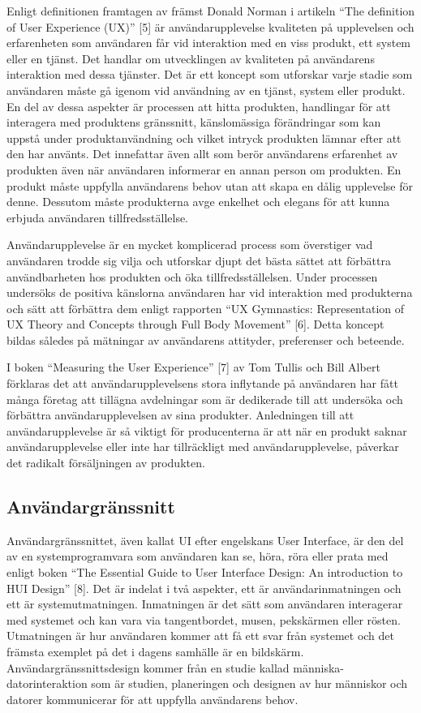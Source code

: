 \documentclass{kththesis}
\begin{document}
Enligt definitionen framtagen av främst Donald Norman i artikeln “The definition of User Experience (UX)” [5] är användarupplevelse kvaliteten på upplevelsen och erfarenheten som användaren får vid interaktion med en viss produkt, ett system eller en tjänst. Det handlar om utvecklingen av kvaliteten på användarens interaktion med dessa tjänster. Det är ett koncept som utforskar varje stadie som användaren måste gå igenom vid användning av en tjänst, system eller produkt. En del av dessa aspekter är processen att hitta produkten, handlingar för att interagera med produktens gränssnitt, känslomässiga förändringar som kan uppstå under produktanvändning och vilket intryck produkten lämnar efter att den har använts. Det innefattar även allt som berör användarens erfarenhet av produkten även när användaren informerar en annan person om produkten. En produkt måste uppfylla användarens behov utan att skapa en dålig upplevelse för denne. Dessutom måste produkterna avge enkelhet och elegans för att kunna erbjuda användaren tillfredsställelse. 

Användarupplevelse är en mycket komplicerad process som överstiger vad användaren trodde sig vilja och utforskar djupt det bästa sättet att förbättra användbarheten hos produkten och öka tillfredsställelsen. Under processen undersöks de positiva känslorna användaren har vid interaktion med produkterna och sätt att förbättra dem enligt rapporten “UX Gymnastics: Representation of UX Theory and Concepts through Full Body Movement” [6]. Detta koncept bildas således på mätningar av användarens attityder, preferenser och beteende. 

I boken “Measuring the User Experience” [7] av Tom Tullis och Bill Albert förklaras det att användarupplevelsens stora inflytande på användaren har fått många företag att tillägna avdelningar som är dedikerade till att undersöka och förbättra användarupplevelsen av sina produkter. Anledningen till att användarupplevelse är så viktigt för producenterna är att när en produkt saknar användarupplevelse eller inte har tillräckligt med användarupplevelse, påverkar det radikalt försäljningen av produkten. 

\subsection{Användargränssnitt}
Användargränssnittet, även kallat UI efter engelskans User Interface, är den del av en systemprogramvara som användaren kan se, höra, röra eller prata med enligt boken “The Essential Guide to User Interface Design: An introduction to HUI Design” [8]. Det är indelat i två aspekter, ett är användarinmatningen och ett är systemutmatningen. Inmatningen är det sätt som användaren interagerar med systemet och kan vara via tangentbordet, musen, pekskärmen eller rösten. Utmatningen är hur användaren kommer att få ett svar från systemet och det främsta exemplet på det i dagens samhälle är en bildskärm. Användargränssnittsdesign kommer från en studie kallad människa-datorinteraktion som är studien, planeringen och designen av hur människor och datorer kommunicerar för att uppfylla användarens behov.
\end{document}
